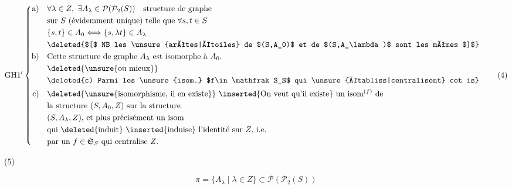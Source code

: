 \[
\mathrm{GH1}'\left\{\begin{aligned}
\text{a)}\quad &\forall\lambda\in Z,\ \exists A_\lambda\in\mathcal P(\mathcal P_2(S))\quad\text{structure de graphe}\\
 &\text{sur }S\ \text{(évidemment unique) telle que }\forall s,t\in S\\
 &\{s,t\}\in A_0\Longleftrightarrow\{s,\lambda t\}\in A_\lambda\\
 &\text{\deleted{$[$ NB les \unsure{arêtes|étoiles} de $(S,A_0)$ et de $(S,A_\lambda)$ sont les mêmes $]$}}\\
\text{b)}\quad &\text{Cette structure de graphe $A_\lambda$ est isomorphe à $A_0$.}\\
 &\text{\deleted{\unsure{ou mieux}}}\\
 &\text{\deleted{c) Parmi les \unsure{isom.} $f\in\mathfrak S_S$ qui \unsure{établiss|centralisent} cet is}}\\
\text{c)}\quad &\text{\deleted{\unsure{isomorphisme, il en existe}} \inserted{On veut qu'il existe} un isom$^{(f)}$ de}\\
 &\text{la structure $(S,A_0,Z)$ sur la structure}\\
 &\text{$(S,A_\lambda,Z)$, et plus précisément un isom}\\
 &\text{qui \deleted{induit} \inserted{induise} l'identité sur $Z$, i.e.}\\
 &\text{par un $f\in\mathfrak S_S$ qui centralise $Z$.}
\end{aligned}\right.\tag*{(4)}
\]

 (5) 

 

\[ \pi=\{A_\lambda\mid\lambda\in Z\}\subset\mathcal P(\mathcal P_2(S)) \]

 


